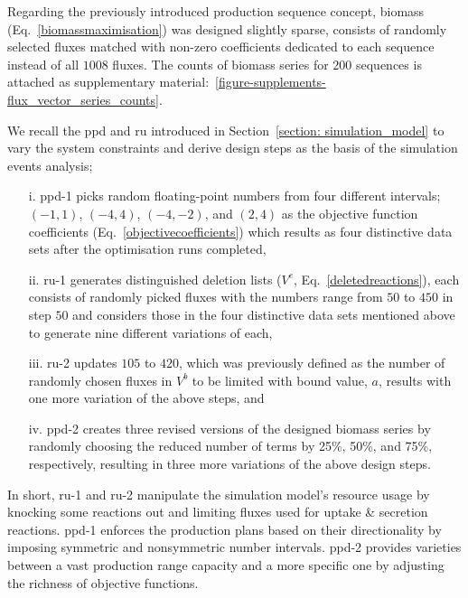 Regarding the previously introduced production sequence concept, biomass (Eq.~\ref{biomassmaximisation}) was designed slightly sparse, consists of randomly selected fluxes matched with non-zero coefficients dedicated to each sequence instead of all $1008$ fluxes. The counts of biomass series for $200$ sequences is attached as supplementary material:~\ref{figure-supplements-flux_vector_series_counts}.

We recall the \acf{ppd} and \acf{ru} introduced in Section~\ref{section: simulation_model} to vary the system constraints and derive design steps as the basis of the simulation events analysis;
\begin{itemize}
	\item[i.] \acs{ppd}-1 picks random floating-point numbers from four different intervals; $(-1, 1)$, $(-4, 4)$, $(-4, -2)$, and $(2, 4)$ as the objective function coefficients (Eq.~\ref{objectivecoefficients}) which results as four distinctive data sets after the optimisation runs completed,
	\item[ii.] \acs{ru}-1 generates distinguished deletion lists ($V^{e}$, Eq.~\ref{deletedreactions}), each consists of randomly picked fluxes with the numbers range from $50$ to $450$ in step $50$ and considers those in the four distinctive data sets mentioned above to generate nine different variations of each,
	\item[iii.] \acs{ru}-2 updates $105$ to $420$, which was previously defined as the number of randomly chosen fluxes in $V^{b}$ to be limited with bound value, $a$, results with one more variation of the above steps, and
	\item[iv.] \acs{ppd}-2 creates three revised versions of the designed biomass series by randomly choosing the reduced number of terms by 25\%, 50\%, and 75\%, respectively, resulting in three more variations of the above design steps.
\end{itemize}

In short, \acs{ru}-1 and \acs{ru}-2 manipulate the simulation model's resource usage by knocking some reactions out and limiting fluxes used for uptake \& secretion reactions. \acs{ppd}-1 enforces the production plans based on their directionality by imposing symmetric and nonsymmetric number intervals. \acs{ppd}-2 provides varieties between a vast production range capacity and a more specific one by adjusting the richness of objective functions. %

